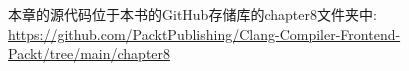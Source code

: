 本章的源代码位于本书的GitHub存储库的chapter8文件夹中: \url{https://github.com/PacktPublishing/Clang-Compiler-Frontend-Packt/tree/main/chapter8}
